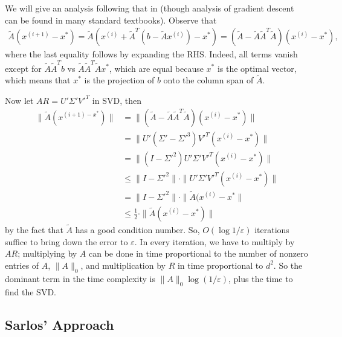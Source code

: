 \documentclass[11pt]{article}
\newcommand{\eps}{\varepsilon}
\begin{document}
We will give an analysis following that in \cite{clarkson2013low} (though analysis of gradient descent can be found in many standard textbooks). Observe that
\begin{align*}
\tilde{A}(x^{(i+1)}-x^*)=\tilde{A}(x^{(i)}+\tilde{A}^T(b-\tilde{A}x^{(i)})-x^*)=(\tilde{A}-\tilde{A}\tilde{A}^T\tilde{A})(x^{(i)}-x^*),
\end{align*}
where the last equality follows by expanding the RHS. Indeed, all terms vanish except for $\tilde{A}\tilde{A}^Tb$ vs $\tilde{A}\tilde{A}^T\tilde{A}x^*$, which are equal because $x^*$ is the optimal vector, which means that $x^*$ is the projection of $b$ onto the column span of $\tilde{A}$.

Now let $AR = U'\Sigma'V'^T$ in SVD, then
\begin{align*}
	\|\tilde{A}(x^{(i+1)-x^*})\|&=\|(\tilde{A}-\tilde{A}\tilde{A}^T\tilde{A})(x^{(i)}-x^*)\|
	\\
	&=\|U'(\Sigma'-\Sigma'^3)V'^T(x^{(i)}-x^*)\|
	\\
	&=\|(I-\Sigma'^2)U'\Sigma'V'^T(x^{(i)}-x^*)\|
	\\
	&\leq\|I-\Sigma'^2\| \cdot \|U'\Sigma'V'^T(x^{(i)}-x^*)\|
	\\
	&=\|I-\Sigma'^2\| \cdot \|\tilde{A}(x^{(i)}-x^*\|
	\\
	&\leq \frac 12 \cdot \|\tilde{A}(x^{(i)}-x^*)\|
\end{align*}
by the fact that $\tilde{A}$ has a good condition number. So, $O(\log 1/\eps)$ iterations suffice to bring down the error to $\eps$. In every iteration, we have to multiply by $AR$; multiplying by $A$ can be done in time proportional to the number of nonzero entries of $A$, $\|A\|_0$, and multiplication by $R$ in time proportional to $d^2$. So the dominant term in the time complexity is $\|A\|_0\log(1/\eps)$, plus the time to find the SVD.

\subsection{Sarlos' Approach}
\end{document}
